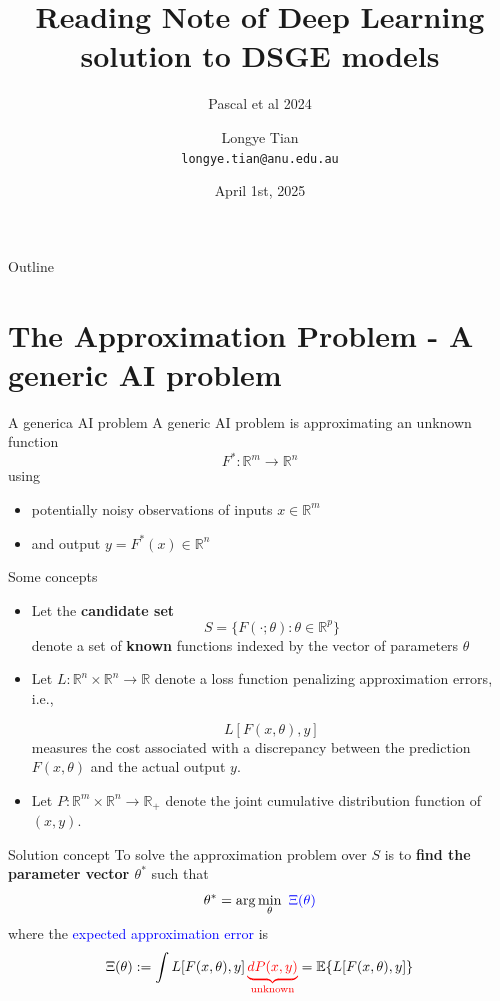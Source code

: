 \documentclass[aspectratio=169]{beamer} %
\title[DL]{Reading Note of Deep Learning solution to DSGE models}
\subtitle{Pascal et al 2024}
\author[Longye]{Longye Tian \\ \texttt{longye.tian@anu.edu.au}}
\institute[ANU]{Australian National University\\ School of Economics}
\date{April 1st, 2025}
\begin{document}
\begin{frame}
  \titlepage
\end{frame}

\begin{frame}{Outline}
  \tableofcontents
\end{frame}

\section{The Approximation Problem - A generic AI problem}
\begin{frame}{A generica AI problem}
    A generic AI problem is approximating an unknown function
$$
F^*: \mathbb{R}^m \to \mathbb{R}^n
$$
using
\begin{itemize}
    \item potentially noisy observations of inputs $x\in\mathbb{R}^m$
    \item and output $y = F^*(x)\in\mathbb{R}^n$
\end{itemize}
\end{frame}

\begin{frame}{Some concepts}
\begin{itemize}
    \item Let the \textbf{candidate set}
    $$
    S = \{F(\cdot; \theta): \theta\in \mathbb{R}^p\}
    $$
    denote a set of \textbf{known} functions indexed by the vector of parameters $\theta$
    \item Let $L:\mathbb{R}^n\times \mathbb{R}^n\to \mathbb{R}$ denote a loss function penalizing approximation errors, i.e.,
    
    $$L[F(x,\theta), y]$$ 
    measures the cost associated with a discrepancy between the prediction $F(x,\theta)$ and the actual output $y$.
    \item Let $P:\mathbb{R}^m\times \mathbb{R}^n\to \mathbb{R}_+$ denote the joint cumulative distribution function of $(x, y)$.
\end{itemize}
    
\end{frame}

\begin{frame}{Solution concept}
To solve the approximation problem over $S$ is to \textbf{find the parameter vector $\theta^*$} such that
$$
\theta^* = \arg\min_{\theta}\,\, \textcolor{blue}{\Xi(\theta)}
$$
where the \textcolor{blue}{expected approximation error} is
$$
\Xi(\theta):= \int L[F(x,\theta ),y]\,\textcolor{red}{\underbrace{dP(x,y)}_{\text{unknown}}} = \mathbb{E}\{L[F(x,\theta),y]\}
$$

    
\end{frame}
\end{document}
